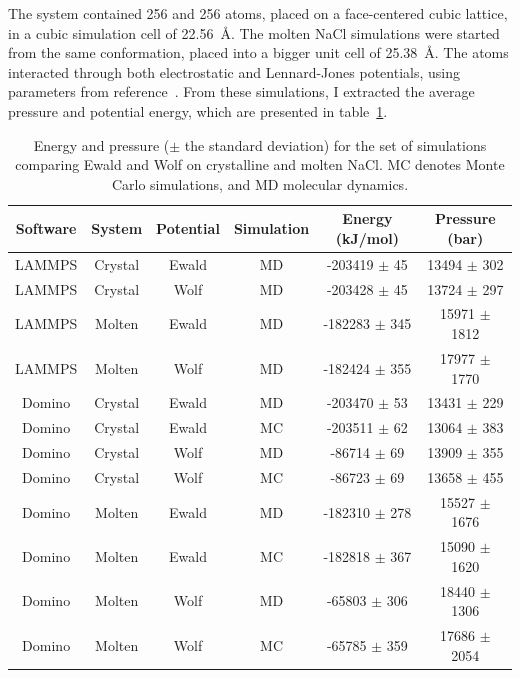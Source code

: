 \documentclass[thesis]{subfiles}
\begin{document}
The system contained 256  and 256  atoms, placed on a
face-centered cubic lattice, in a cubic simulation cell of \SI{22.56}{\AA}. The
molten NaCl simulations were started from the same conformation, placed into a
bigger unit cell of \SI{25.38}{\AA}. The atoms interacted through both
electrostatic and Lennard-Jones potentials, using parameters from
reference~\cite{Mao2012}. From these simulations, I extracted the average
pressure and potential energy, which are presented in
table~\ref{tab:ewald-vs-wolf}.

\begin{table}[ht]
    \caption{Energy and pressure ($\pm$ the standard deviation) for the set of
    simulations comparing Ewald and Wolf on crystalline and molten NaCl. MC
    denotes Monte Carlo simulations, and MD molecular dynamics.}
    \label{tab:ewald-vs-wolf}
    \begin{tabular}{c c c c c c}
        \toprule
        Software & System  & Potential & Simulation & Energy (\si{kJ/mol}) & Pressure (bar) \\
        \midrule
        LAMMPS   & Crystal &    Ewald  &    MD      & -203419 $\pm$ 45  & 13494 $\pm$ 302  \\
        LAMMPS   & Crystal &    Wolf   &    MD      & -203428 $\pm$ 45  & 13724 $\pm$ 297  \\
        LAMMPS   & Molten  &    Ewald  &    MD      & -182283 $\pm$ 345 & 15971 $\pm$ 1812 \\
        LAMMPS   & Molten  &    Wolf   &    MD      & -182424 $\pm$ 355 & 17977 $\pm$ 1770 \\
        \midrule
        Domino   & Crystal &    Ewald  &    MD      & -203470 $\pm$ 53 & 13431 $\pm$ 229 \\
        Domino   & Crystal &    Ewald  &    MC      & -203511 $\pm$ 62 & 13064 $\pm$ 383 \\
        Domino   & Crystal &    Wolf   &    MD      & -86714 $\pm$ 69 & 13909 $\pm$ 355 \\
        Domino   & Crystal &    Wolf   &    MC      & -86723 $\pm$ 69 & 13658 $\pm$ 455 \\
        Domino   & Molten  &    Ewald  &    MD      & -182310 $\pm$ 278 & 15527 $\pm$ 1676 \\
        Domino   & Molten  &    Ewald  &    MC      & -182818 $\pm$ 367 & 15090 $\pm$ 1620 \\
        Domino   & Molten  &    Wolf   &    MD      & -65803 $\pm$ 306 & 18440 $\pm$ 1306 \\
        Domino   & Molten  &    Wolf   &    MC      & -65785 $\pm$ 359 & 17686 $\pm$ 2054 \\
        \bottomrule
    \end{tabular}
\end{table}
\end{document}
